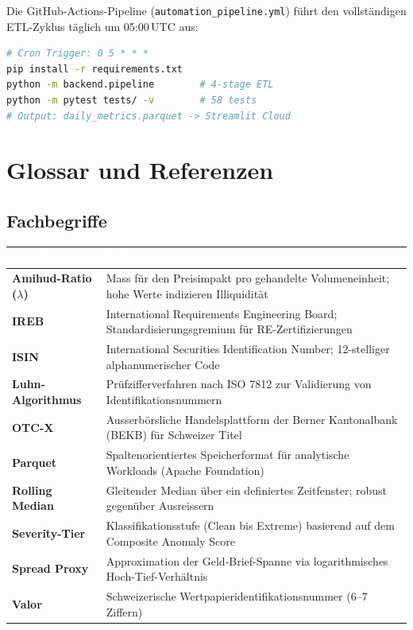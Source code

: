 \documentclass[12pt, a4paper, oneside]{report}
\newcommand{\code}[1]{\texttt{\small\textcolor{darknavy}{#1}}}
\begin{document}
Die GitHub-Actions-Pipeline (\code{automation\_pipeline.yml}) führt den vollständigen ETL-Zyklus täglich um 05:00\,UTC aus:

\begin{lstlisting}[language=bash, caption={Vereinfachter CI/CD-Ablauf}]
# Cron Trigger: 0 5 * * *
pip install -r requirements.txt
python -m backend.pipeline        # 4-stage ETL
python -m pytest tests/ -v        # 58 tests
# Output: daily_metrics.parquet -> Streamlit Cloud
\end{lstlisting}

\chapter{Glossar und Referenzen}

\section{Fachbegriffe}

\begin{table}[H]
\centering
{}
\begin{tabularx}{\textwidth}{>{\bfseries\sffamily}p{3.5cm} X}
  \toprule
  \rowcolor{darknavy} \textcolor{white}{Begriff} & \textcolor{white}{Definition} \\
  \midrule
  Amihud-Ratio ($\lambda$) & Mass für den Preisimpakt pro gehandelte Volumeneinheit; hohe Werte indizieren Illiquidität \\
  IREB                     & International Requirements Engineering Board; Standardisierungsgremium für RE-Zertifizierungen \\
  ISIN                     & International Securities Identification Number; 12-stelliger alphanumerischer Code \\
  Luhn-Algorithmus         & Prüfzifferverfahren nach ISO 7812 zur Validierung von Identifikationsnummern \\
  OTC-X                    & Ausserbörsliche Handelsplattform der Berner Kantonalbank (BEKB) für Schweizer Titel \\
  Parquet                  & Spaltenorientiertes Speicherformat für analytische Workloads (Apache Foundation) \\
  Rolling Median           & Gleitender Median über ein definiertes Zeitfenster; robust gegenüber Ausreissern \\
  Severity-Tier            & Klassifikationsstufe (Clean bis Extreme) basierend auf dem Composite Anomaly Score \\
  Spread Proxy             & Approximation der Geld-Brief-Spanne via logarithmisches Hoch-Tief-Verhältnis \\
  Valor                    & Schweizerische Wertpapieridentifikationsnummer (6--7 Ziffern) \\
  \bottomrule
\end{tabularx}
\end{table}
\end{document}
